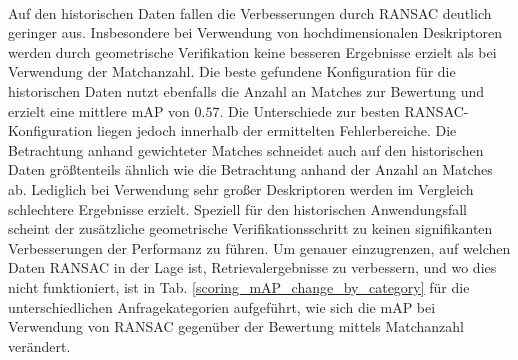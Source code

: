\\
Auf den historischen Daten fallen die Verbesserungen durch RANSAC deutlich geringer aus. Insbesondere bei Verwendung von hochdimensionalen Deskriptoren werden durch geometrische Verifikation keine besseren Ergebnisse erzielt als bei Verwendung der Matchanzahl. Die beste gefundene Konfiguration für die historischen Daten nutzt ebenfalls die Anzahl an Matches zur Bewertung und erzielt eine mittlere mAP von $0.57$. Die Unterschiede zur besten RANSAC-Konfiguration liegen jedoch innerhalb der ermittelten Fehlerbereiche. Die Betrachtung anhand gewichteter Matches schneidet auch auf den historischen Daten größtenteils ähnlich wie die Betrachtung anhand der Anzahl an Matches ab. Lediglich bei Verwendung sehr großer Deskriptoren werden im Vergleich schlechtere Ergebnisse erzielt. Speziell für den historischen Anwendungsfall scheint der zusätzliche geometrische Verifikationsschritt zu keinen signifikanten Verbesserungen der Performanz zu führen.
Um genauer einzugrenzen, auf welchen Daten RANSAC in der Lage ist, Retrievalergebnisse zu verbessern, und wo dies nicht funktioniert, ist in Tab. \ref{scoring_mAP_change_by_category} für die unterschiedlichen Anfragekategorien aufgeführt, wie sich die mAP bei Verwendung von RANSAC gegenüber der Bewertung mittels Matchanzahl verändert.
